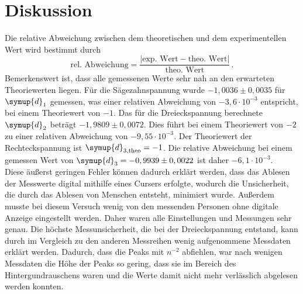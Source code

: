 \section{Diskussion}
\label{sec:Diskussion}
Die relative Abweichung zwischen dem theoretischen und dem experimentellen Wert wird bestimmt durch
$$\text{rel. Abweichung} = \frac{|\text{exp. Wert} - \text{theo. Wert}|}{\text{theo. Wert}}\,.$$
Bemerkenswert ist, dass alle gemessenen Werte sehr nah an den erwarteten Theoriewerten liegen. 
Für die Sägezahnspannung wurde $- 1,0036 \pm 0,0035$ für $\symup{d}_1$ gemessen, was einer relativen Abweichung von $- 3,6 \cdot 10^{-3}$ entspricht, bei einem Theoriewert 
von $- 1$. Das für die Dreieckspannung berechnete $\symup{d}_2$ beträgt $- 1,9809 \pm 0,0072$. Dies führt bei einem Theoriewert von $- 2$ zu einer relativen Abweichung von 
$- 9,55 \cdot 10^{-3}$. Der Theoriewert der Rechteckspannung ist $\symup{d}_{3,\text{theo}} = - 1$. Die relative Abweichung bei einem gemessen Wert von 
$\symup{d}_3 = - 0,9939 \pm 0,0022$ ist daher $- 6,1 \cdot 10^{-3}$. \\
Diese äußerst geringen Fehler können dadurch erklärt werden, dass das Ablesen der Messwerte digital mithilfe eines Cursers erfolgte, wodurch die Unsicherheit, 
die durch das Ablesen von Menschen entsteht, minimiert wurde. Außerdem musste bei diesem Versuch wenig von den messenden Personen ohne digitale Anzeige eingestellt
werden. Daher waren alle Einstellungen und Messungen sehr genau. Die höchste Messunsicherheit, die bei der Dreieckspannung entstand, kann durch 
im Vergleich zu den anderen Messreihen wenig aufgenommene Messdaten erklärt werden. Dadurch, dass die Peaks mit $n^{-2}$ abfiehlen, war nach wenigen Messdaten 
die Höhe der Peaks so gering, dass sie im Bereich des Hintergundrauschens waren und die Werte damit nicht mehr verlässlich abgelesen werden konnten.  
